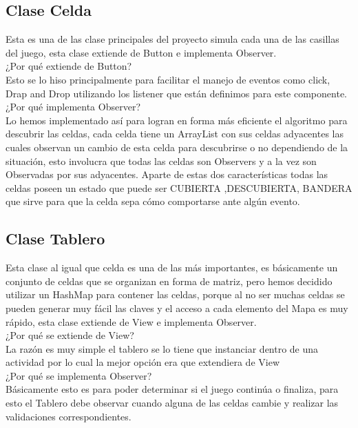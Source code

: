 \documentclass[11pt]{article} %
\begin{document}
\subsection{Clase Celda}
Esta es una de las clase principales del proyecto simula cada una de las casillas del juego, esta clase extiende de Button e implementa Observer.\\
¿Por qué extiende de Button?\\
Esto se lo hiso principalmente para facilitar el manejo de eventos como click, Drap and Drop utilizando los listener que están definimos para este componente.\\
¿Por qué implementa Observer?\\
Lo hemos implementado así para logran en forma más eficiente el algoritmo para descubrir las celdas, cada celda tiene un ArrayList con sus celdas adyacentes las cuales observan un cambio de esta celda para descubrirse o no dependiendo de la situación, esto involucra que todas las celdas son Observers y a la vez son Observadas por sus adyacentes.
Aparte de estas dos características todas las celdas poseen un estado que puede ser CUBIERTA ,DESCUBIERTA, BANDERA que sirve para que la celda sepa cómo comportarse ante algún evento.\\

\subsection{Clase Tablero}
Esta clase al igual que celda es una de las más importantes, es básicamente un conjunto de celdas que se organizan en forma de matriz, pero hemos decidido utilizar un HashMap para contener las celdas, porque al no ser muchas celdas se pueden generar muy fácil las claves y el acceso a cada elemento del Mapa es muy rápido, esta clase extiende de View e implementa Observer.\\
¿Por qué se extiende de View?\\
La razón es muy simple el tablero se lo tiene que instanciar dentro de una actividad por lo cual la mejor opción era que extendiera de View\\
¿Por qué se implementa Observer?\\
Básicamente esto es para poder determinar si el juego continúa o finaliza, para esto el Tablero debe observar cuando alguna de las celdas cambie y realizar las validaciones correspondientes.\\
\end{document}
